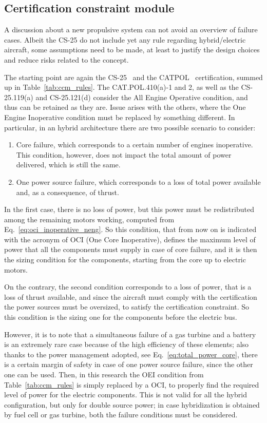 \subsection{Certification constraint module}
\label{subsec:chap3_ccm_hybrid}

A discussion about a new propulsive system can not avoid an overview of failure cases. 
Albeit the CS-25 do not include yet any rule regarding hybrid/electric aircraft, some assumptions need to be made, at least to justify the design choices and reduce risks related to the concept. 

The starting point are again the CS-25~\cite{bib:cs25} and the CATPOL~\cite{bib:catpol} certification, summed up in Table~\ref{tab:ccm_rules}. 
The CAT.POL.410(a)-1 and 2, as well as the CS-25.119(a) and CS-25.121(d) consider the All Engine Operative condition, and thus can be retained as they are. 
Issue arises with the others, where the One Engine Inoperative condition must be replaced by something different. 
In particular, in an hybrid architecture there are two possible scenario to consider:
\begin{enumerate}
	\item Core failure, which corresponds to a certain number of engines inoperative. 
	This condition, however, does not impact the total amount of power delivered, which is still the same. 
	
	\item One power source failure, which corresponds to a loss of total power available and, as a consequence, of thrust.
\end{enumerate}
In the first case, there is no loss of power, but this power must be redistributed among the remaining motors working, computed from Eq.~\eqref{eq:oci_inoperative_neng}. 
So this condition, that from now on is indicated with the acronym of OCI (One Core Inoperative), defines the maximum level of power that all the components must supply in case of core failure, and it is then the sizing condition for the components, starting from the core up to electric motors.

On the contrary, the second condition corresponds to a loss of power, that is a loss of thrust available, and since the aircraft must comply with the certification the power sources must be oversized, to satisfy the certification constraint. 
So this condition is the sizing one for the components before the electric bus. 

However, it is to note that a simultaneous failure of a gas turbine and a battery is an extremely rare case because of the high efficiency of these elements; also thanks to the power management adopted, see Eq.~\eqref{eq:total_power_core}, there is a certain margin of safety in case of one power source failure, since the other one can be used. 
Then, in this research the OEI condition from Table~\ref{tab:ccm_rules} is simply replaced by a OCI, to properly find the required level of power for the electric components. 
This is not valid for all the hybrid configuration, but only for double source power; in case hybridization is obtained by fuel cell or gas turbine, both the failure conditions must be considered. 

